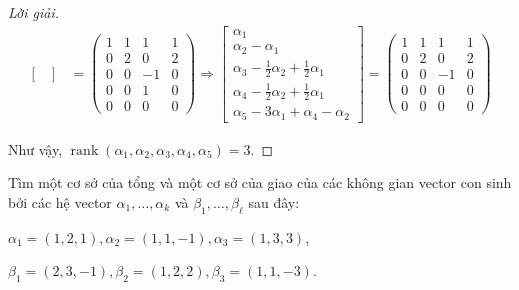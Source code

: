 \begin{proof}[Lời giải]
\begin{align*}
\begin{bmatrix}
        \end{bmatrix} & =
        \begin{pmatrix}
            1 & 1 & 1  & 1 \\
            0 & 2 & 0  & 2 \\
            0 & 0 & -1 & 0 \\
            0 & 0 & 1  & 0 \\
            0 & 0 & 0  & 0
        \end{pmatrix}
        \Longrightarrow
        \begin{bmatrix}
            \alpha_{1}                                                 \\
            \alpha_{2}-\alpha_{1}                                      \\
            \alpha_{3}-\frac{1}{2}\alpha_{2}+\frac{1}{2}\alpha_{1}     \\
            \alpha_{4} - \frac{1}{2}\alpha_{2} + \frac{1}{2}\alpha_{1} \\
            \alpha_{5} - 3\alpha_{1} + \alpha_{4} - \alpha_{2}
        \end{bmatrix}=
        \begin{pmatrix}
            1 & 1 & 1  & 1 \\
            0 & 2 & 0  & 2 \\
            0 & 0 & -1 & 0 \\
            0 & 0 & 0  & 0 \\
            0 & 0 & 0  & 0
        \end{pmatrix}
    \end{align*}
    
    Như vậy, $\operatorname{rank}(\alpha_{1},\alpha_{2},\alpha_{3},\alpha_{4},\alpha_{5}) = 3$.
\end{proof}

\par Tìm một cơ sở của tổng và một cơ sở của giao của các không gian vector con sinh bởi các hệ vector $\alpha_{1},\ldots,\alpha_{k}$ và $\beta_{1},\ldots,\beta_{\ell}$ sau đây:

\begin{exercise}
    $\alpha_{1} = (1,2,1), \alpha_{2} = (1,1,-1), \alpha_{3} = (1,3,3)$,
    
    $\beta_{1} = (2,3,-1), \beta_{2} = (1,2,2), \beta_{3} = (1,1,-3)$.
\end{exercise}

